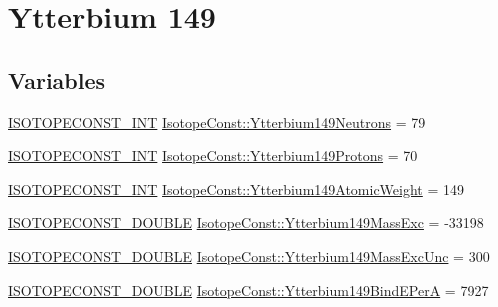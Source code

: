 \hypertarget{group___isotope_const-_ytterbium-_yb149}{}\section{Ytterbium 149}
\label{group___isotope_const-_ytterbium-_yb149}
\subsection*{Variables}
\begin{DoxyCompactItemize}
\item 
\mbox{\hyperlink{group___isotope_const-_macros_ga5f18360b3e99483a35c32d789e62621c}{I\+S\+O\+T\+O\+P\+E\+C\+O\+N\+S\+T\+\_\+\+I\+NT}} \mbox{\hyperlink{group___isotope_const-_ytterbium-_yb149_ga008db9dec8fef469076b15cca37c7878}{Isotope\+Const\+::\+Ytterbium149\+Neutrons}} = 79
\item 
\mbox{\hyperlink{group___isotope_const-_macros_ga5f18360b3e99483a35c32d789e62621c}{I\+S\+O\+T\+O\+P\+E\+C\+O\+N\+S\+T\+\_\+\+I\+NT}} \mbox{\hyperlink{group___isotope_const-_ytterbium-_yb149_ga70d881295f93459a14e51e90351dd13f}{Isotope\+Const\+::\+Ytterbium149\+Protons}} = 70
\item 
\mbox{\hyperlink{group___isotope_const-_macros_ga5f18360b3e99483a35c32d789e62621c}{I\+S\+O\+T\+O\+P\+E\+C\+O\+N\+S\+T\+\_\+\+I\+NT}} \mbox{\hyperlink{group___isotope_const-_ytterbium-_yb149_ga78a9811d68643d4b090b9e490411e0d4}{Isotope\+Const\+::\+Ytterbium149\+Atomic\+Weight}} = 149
\item 
\mbox{\hyperlink{group___isotope_const-_macros_ga8f45a7272ce02c0b4c65c44636ed719a}{I\+S\+O\+T\+O\+P\+E\+C\+O\+N\+S\+T\+\_\+\+D\+O\+U\+B\+LE}} \mbox{\hyperlink{group___isotope_const-_ytterbium-_yb149_ga4fc286f03484e86713f008d16905f20d}{Isotope\+Const\+::\+Ytterbium149\+Mass\+Exc}} = -\/33198
\item 
\mbox{\hyperlink{group___isotope_const-_macros_ga8f45a7272ce02c0b4c65c44636ed719a}{I\+S\+O\+T\+O\+P\+E\+C\+O\+N\+S\+T\+\_\+\+D\+O\+U\+B\+LE}} \mbox{\hyperlink{group___isotope_const-_ytterbium-_yb149_gae5847fb467831c064f9be7a4484bcb57}{Isotope\+Const\+::\+Ytterbium149\+Mass\+Exc\+Unc}} = 300
\item 
\mbox{\hyperlink{group___isotope_const-_macros_ga8f45a7272ce02c0b4c65c44636ed719a}{I\+S\+O\+T\+O\+P\+E\+C\+O\+N\+S\+T\+\_\+\+D\+O\+U\+B\+LE}} \mbox{\hyperlink{group___isotope_const-_ytterbium-_yb149_ga295a1c3682b6d1b2c1afffd02933dd93}{Isotope\+Const\+::\+Ytterbium149\+Bind\+E\+PerA}} = 7927
\item 

\end{DoxyCompactItemize}
